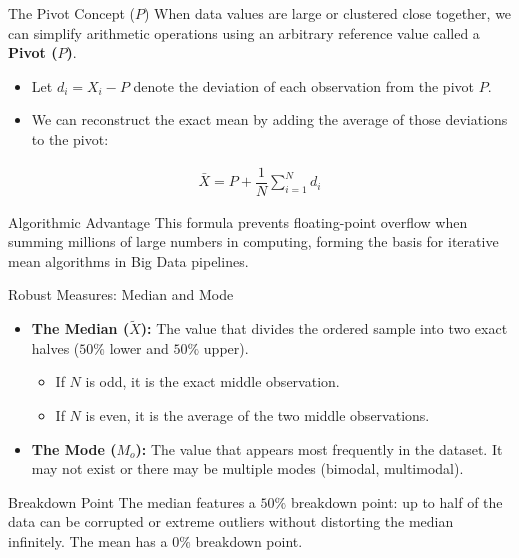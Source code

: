 \documentclass[aspectratio=169,xcolor={dvipsnames,table}]{beamer}
\begin{document}
\begin{frame}{The Pivot Concept ($P$)}
  \scriptsize
  \vspace{-0.15cm}
  When data values are large or clustered close together, we can simplify arithmetic operations using an arbitrary reference value called a \textbf{Pivot ($P$)}. \pause
  \begin{itemize}
    \item Let $d_i = X_i - P$ denote the deviation of each observation from the pivot $P$. \pause
    \item We can reconstruct the exact mean by adding the average of those deviations to the pivot:
  \end{itemize}
  \begin{align}
    \bar{X} = P + \dfrac{1}{N} \sum_{i=1}^{N} d_i
  \end{align}
  \pause
  \begin{block}{Algorithmic Advantage}
    This formula prevents floating-point overflow when summing millions of large numbers in computing, forming the basis for iterative mean algorithms in Big Data pipelines.
  \end{block}
\end{frame}

\begin{frame}{Robust Measures: Median and Mode}
  \scriptsize
  \vspace{-0.15cm}
  \begin{itemize}
    \item \textbf{The Median ($\tilde{X}$):} The value that divides the ordered sample into two exact halves ($50\%$ lower and $50\%$ upper).
      \begin{itemize}
        \item If $N$ is odd, it is the exact middle observation.
        \item If $N$ is even, it is the average of the two middle observations.
      \end{itemize}
    \pause
    \item \textbf{The Mode ($M_o$):} The value that appears most frequently in the dataset. It may not exist or there may be multiple modes (bimodal, multimodal). \pause
  \end{itemize}
  \vspace{0.4em}
  \begin{block}{Breakdown Point}
    The median features a $50\%$ breakdown point: up to half of the data can be corrupted or extreme outliers without distorting the median infinitely. The mean has a $0\%$ breakdown point.
  \end{block}
\end{frame}
\end{document}
